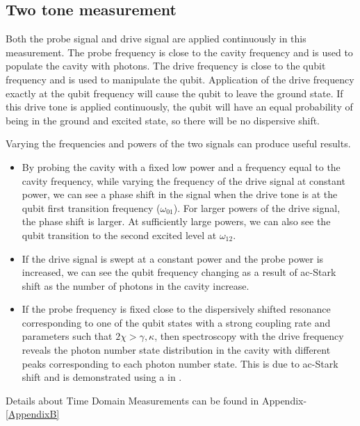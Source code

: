 \subsection{Two tone measurement}

Both the probe signal and drive signal are applied continuously in this measurement. The probe frequency is close to the cavity frequency and is used to populate the cavity with photons. The drive frequency is close to the qubit frequency and is used to manipulate the qubit. Application of the drive frequency exactly at the qubit frequency will cause the qubit to leave the ground state. If this drive tone is applied continuously, the qubit will have an equal probability of being in the ground and excited state, so there will be no dispersive shift.

Varying the frequencies and powers of the two signals can produce useful results.
\begin{itemize}
\item By probing the cavity with a fixed low power and a frequency equal to the cavity frequency, while varying the frequency of the drive signal at constant power, we can see a phase shift in the signal when the drive tone is at the qubit first transition frequency ($\omega_{01}$). For larger powers of the drive signal, the phase shift is larger. At sufficiently large powers, we can also see the qubit transition to the second excited level at $\omega_{12}$.
\item If the drive signal is swept at a constant power and the probe power is increased, we can see the qubit frequency changing as a result of ac-Stark shift as the number of photons in the cavity increase.
\item If the probe frequency is fixed close to the dispersively shifted resonance corresponding to one of the qubit states with a strong coupling rate and parameters such that $2\chi>\gamma,\kappa$, then spectroscopy with the drive frequency reveals the photon number state distribution in the cavity with different peaks corresponding to each photon number state. This is due to ac-Stark shift and is demonstrated using a \CPB in \cite{Schuster2007a}.
\end{itemize}

Details about Time Domain Measurements can be found in Appendix-\ref{AppendixB}